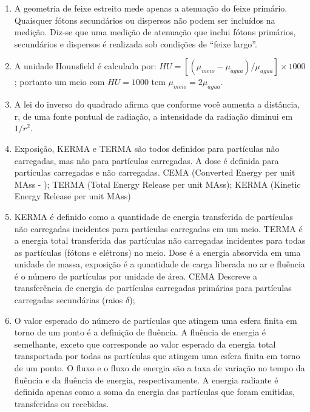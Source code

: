 \documentclass[11pt,a4paper]{article}
\begin{document}
\begin{enumerate}
        \item A geometria de feixe estreito mede apenas a atenuação do feixe primário. Quaisquer fótons secundários ou dispersos não podem ser incluídos na medição. Diz-se que uma medição de atenuação que inclui fótons primários, secundários e dispersos é realizada sob condições de “feixe largo”.
        
        \item A unidade Hounsfield é calculada por: $HU = [(\mu_{meio} - \mu_{agua})/\mu_{agua}] \times 1000$; portanto um meio com $HU = 1000$ tem $\mu_{meio} = 2\mu_{agua}$.

        \item A lei do inverso do quadrado afirma que conforme você aumenta a distância, r, de uma fonte pontual de radiação, a intensidade da radiação diminui em $1/r^2$.

        \item Exposição, KERMA e TERMA são todos definidos para partículas não carregadas, mas não para partículas carregadas. A dose é definida para partículas carregadas e não carregadas. CEMA (Converted Energy per unit MAss - ); TERMA (Total Energy Release per unit MAss); KERMA (Kinetic Energy Release per unit MAss)
        
        \item KERMA é definido como a quantidade de energia transferida de partículas não carregadas incidentes para partículas carregadas em um meio. TERMA é a energia total transferida das partículas não carregadas incidentes para todas as partículas (fótons e elétrons) no meio. Dose é a energia absorvida em uma unidade de massa, exposição é a quantidade de carga liberada no ar e fluência é o número de partículas por unidade de área. CEMA Descreve a transferência de energia de partículas carregadas primárias para partículas carregadas secundárias (raios $\delta$);

        \item O valor esperado do número de partículas que atingem uma esfera finita em torno de um ponto é a definição de fluência. A fluência de energia é semelhante, exceto que corresponde ao valor esperado da energia total transportada por todas as partículas que atingem uma esfera finita em torno de um ponto. O fluxo e o fluxo de energia são a taxa de variação no tempo da fluência e da fluência de energia, respectivamente. A energia radiante é definida apenas como a soma da energia das partículas que foram emitidas, transferidas ou recebidas.


\end{enumerate}
\end{document}
